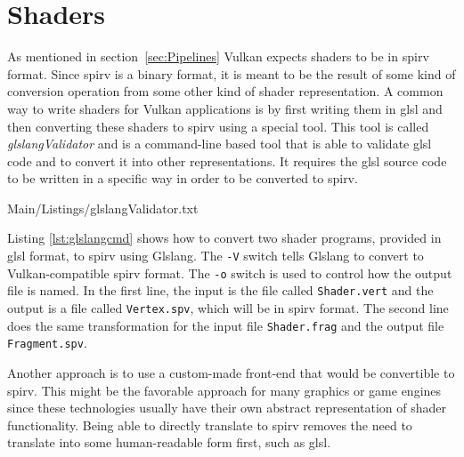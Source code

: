   \section{Shaders}
  \label{sec:EnvShaders}
    As mentioned in section~\ref{sec:Pipelines} Vulkan expects shaders to be in \gls{spirv} format. Since \gls{spirv} is a binary format, it is meant to be the result of some kind of conversion operation from some other kind of shader representation.  A common way to write shaders for Vulkan applications is by first writing them in \gls{glsl} and then converting these shaders to \gls{spirv} using a special tool. This tool is called \textit{glslangValidator}\cite{glslangrepo} and is a command-line based tool that is able to validate \gls{glsl} code and to convert it into other representations. It requires the \gls{glsl} source code to be written in a specific way in order to be converted to \gls{spirv}.

    
    {Main/Listings/glslangValidator.txt}


    Listing \ref{lst:glslangcmd} shows how to convert two shader programs, provided in \gls{glsl} format, to \gls{spirv} using Glslang. The \lstinline{-V} switch tells Glslang to convert to Vulkan-compatible \gls{spirv} format. The \lstinline{-o} switch is used to control how the output file is named. In the first line, the input is the file called \lstinline{Shader.vert} and the output is a file called \lstinline{Vertex.spv}, which will be in \gls{spirv} format. The second line does the same transformation for the input file \lstinline{Shader.frag} and the output file \lstinline{Fragment.spv}.

    Another approach is to use a custom-made front-end that would be convertible to \gls{spirv}. This might be the favorable approach for many graphics or game engines since these technologies usually have their own abstract representation of shader functionality. Being able to directly translate to \gls{spirv} removes the need to translate into some human-readable form first, such as \gls{glsl}.


